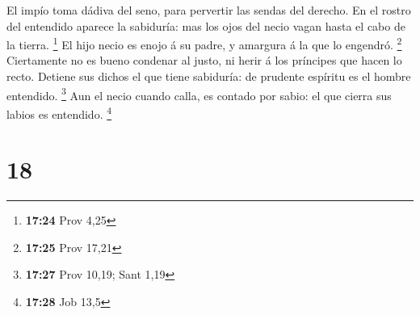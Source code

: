 El impío toma dádiva del seno, para pervertir las sendas del derecho.
 En el rostro del entendido aparece la sabiduría: mas los
ojos del necio vagan hasta el cabo de la tierra. \footnote{\textbf{17:24}
  Prov 4,25}  El hijo necio es enojo á su padre, y
amargura á la que lo engendró. \footnote{\textbf{17:25} Prov 17,21}
 Ciertamente no es bueno condenar al justo, ni herir á
los príncipes que hacen lo recto.  Detiene sus dichos el
que tiene sabiduría: de prudente espíritu es el hombre entendido.
\footnote{\textbf{17:27} Prov 10,19; Sant 1,19}  Aun el
necio cuando calla, es contado por sabio: el que cierra sus labios es
entendido. \footnote{\textbf{17:28} Job 13,5}

\hypertarget{section-17}{%
\section{18}\label{section-17}}

